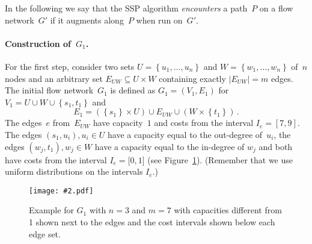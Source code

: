\documentclass[11pt]{article}
\newcommand{\DOT}{\,.}
\newcommand{\SET}[1]{\left\{#1\right\}}
\newcommand{\GFX}[2][]{\texttt{[image: \#2.pdf]}}
\newenvironment{fig}
{\begin{figure}[th]\begin{center}}
{\end{center}\end{figure}}
\begin{document}
In the following we say that the SSP algorithm \emph{encounters} a path~$P$ on a flow network~$G'$ if it augments along~$P$
when run on~$G'$.

\paragraph{Construction of~$G_1$.}
For the first step, consider two sets $U = \SET{ u_1, \ldots, u_n }$ and $W = \SET{ w_1, \ldots, w_n }$ of~$n$ nodes and an arbitrary set $E_{UW} \subseteq U \times W$ containing exactly $|E_{UW}| = m$ edges. The initial flow network~$G_1$ is defined as $G_1 = (V_1, E_1)$ for $V_1 = U \cup W \cup \SET{ s_1, t_1 }$ and
\[
  E_1 = (\SET{s_1} \times U) \cup E_{UW} \cup (W \times \SET{t_1}) \DOT
\]
The edges~$e$ from~$E_{UW}$ have capacity~$1$ and costs from the interval $I_e = [7, 9]$. 
The edges $(s_1,u_i), u_i \in U$ have a capacity equal to the out-degree of~$u_i$, 
the edges $(w_j,t_1), w_j \in W$ have a capacity equal to the in-degree of $w_j$ and both have costs from the interval $I_e = [0, 1$] (see Figure~\ref{fig:step I}).
(Remember that we use uniform distributions on the intervals $I_e$.)
\begin{fig}
  \GFX[width=0.5\textwidth]{Initialgraph}
 \caption[]
   {Example for $G_1$ with $n=3$ and $m = 7$ with capacities different from 1 shown next to the edges and the cost intervals shown below each edge set.} 
  \label{fig:step I}
\end{fig}
\end{document}
